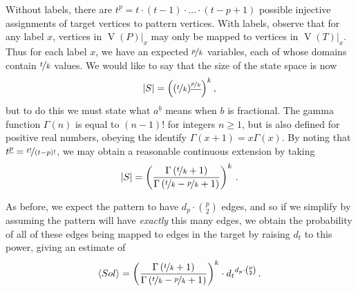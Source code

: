 \documentclass[twoside,11pt]{article}
\begin{document}
Without labels, there are $t^{\underline{p}} = t \cdot (t - 1) \cdot \ldots \cdot (t - p + 1)$
possible injective assignments of target vertices to pattern vertices.  With labels, observe that
for any label $x$, vertices in $\operatorname{V}(P)|_x$ may only be mapped to vertices in
$\operatorname{V}(T)|_x$.  Thus for each label $x$, we have an expected $\nicefrac{p}{k}$ variables,
each of whose domains contain $\nicefrac{t}{k}$ values. We would like to say that the size of the
state space is now \[ |S| = \left((\nicefrac{t}{k})^{\underline{\nicefrac{p}{k}}}\right)^{k}
\textnormal{,} \] but to do this we must state what $a^{\underline{b}}$ means when $b$ is
fractional. The gamma function $\Gamma(n)$ is equal to $(n - 1)!$ for integers $n \ge 1$, but is also
defined for positive real numbers, obeying the identify $\Gamma(x + 1) = x\Gamma(x)$. By noting that
$t^{\underline{p}} = \nicefrac{t!}{(t - p)!}$, we may obtain a reasonable
continuous extension by taking \[ |S| = \left(\frac{\Gamma\left(\nicefrac{t}{k} +
1\right)}{\Gamma\left(\nicefrac{t}{k} - \nicefrac{p}{k} + 1\right)}\right)^{k} \textnormal{\,.} \]

As before, we expect the pattern to have $d_p \cdot \binom{p}{2}$ edges, and so if we simplify by
assuming the pattern will have \emph{exactly} this many edges, we obtain the
probability of all of these edges being mapped to edges in the target by raising $d_t$ to this
power, giving an estimate of \begin{equation}\label{equation:non-induced-labelled-prediction} \langle Sol \rangle = \left(
    \frac{\Gamma\left(\nicefrac{t}{k} + 1\right)}{\Gamma\left(\nicefrac{t}{k} - \nicefrac{p}{k} +
1\right)} \right)^{k}  \cdot
{d_t}^{d_p \cdot \binom{p}{2}} \textnormal{\,.} \end{equation}
\end{document}
